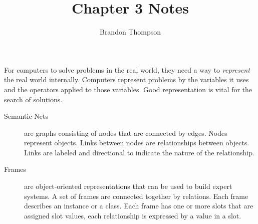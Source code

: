 \documentclass[a4paper]{article}
\begin{document}
	\author{Brandon Thompson}
	\title{Chapter 3 Notes}
	\maketitle
	\medskip
	
	For computers to solve problems in the real world, they need a way to
	\textit{represent} the real world internally. Computers represent 
	problems by the variables it uses and the operators applied to
	those variables. Good representation is vital for the search of solutions.\\

	\begin{description}
		\item[Semantic Nets] are graphs consisting of nodes that are
			connected by edges. Nodes represent objects. Links
			between nodes are relationships between objects.
			Links are labeled and directional to indicate the nature
			of the relationship.
		\item[Frames] are object-oriented representations that can be used
			to build expert systems. A set of frames are connected together
			by relations. Each frame describes an instance or a class. Each
			frame has one or more slots that are assigned slot values, each
			relationship is expressed by a value in a slot.
			
	\end{description}
\end{document}
